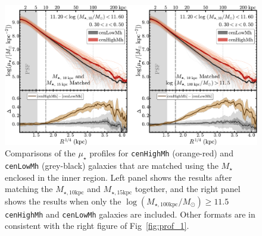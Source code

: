\documentclass[a4paper,fleqn,usenatbib]{mnras}
\def\rbcg{\texttt{cenHighMh}}
\def\nbcg{\texttt{cenLowMh}}
\def\mstar{{$M_{\star}$}}
\def\minn{{$M_{\star,10\mathrm{kpc}}$}}
\def\meff{{$M_{\star,15\mathrm{kpc}}$}}
\def\logmtot{{$\log (M_{\star,100\mathrm{kpc}}/M_{\odot})$}}
\def\mden{{$\mu_{\star}$}}
\begin{document}
  \begin{figure}
      \centering 
      \includegraphics[width=15.5cm]{fig/redbcg_prof_4}
      \caption{
          Comparisons of the \mden{} profiles for \rbcg{} (orange-red) and \nbcg{} 
          (grey-black) galaxies that are matched using the \mstar{} enclosed in the 
          inner region. 
          Left panel shows the results after matching the \minn{} and \meff{} together, 
          and the right panel shows the results when only the \logmtot{}$\ge 11.5$
          \rbcg{} and \nbcg{} galaxies are included.
          Other formats are in consistent with the right figure of Fig~\ref{fig:prof_1}.
          }
      \label{fig:prof_4} 
  \end{figure}
\end{document}
